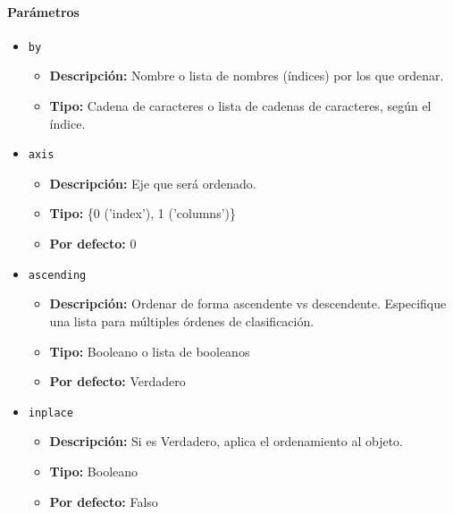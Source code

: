         \paragraph{\textbf{Parámetros}}
        \begin{itemize}
            \item \texttt{by}
                \begin{itemize}
                    \item \textbf{Descripción:} Nombre o lista de nombres (índices) por los que ordenar.
                    \item \textbf{Tipo:} Cadena de caracteres o lista de cadenas de caracteres, según el índice.
                \end{itemize}

            \item \texttt{axis}
                \begin{itemize}
                    \item \textbf{Descripción:} Eje que será ordenado.
                    \item \textbf{Tipo:} \{0 ('index'), 1 ('columns')\}
                    \item \textbf{Por defecto:} 0
                \end{itemize}

            \item \texttt{ascending}
                \begin{itemize}
                    \item \textbf{Descripción:} Ordenar de forma ascendente vs descendente. Especifique una lista para múltiples órdenes de clasificación.
                    \item \textbf{Tipo:} Booleano o lista de booleanos
                    \item \textbf{Por defecto:} Verdadero
                \end{itemize}

            \item \texttt{inplace}
                \begin{itemize}
                    \item \textbf{Descripción:} Si es Verdadero, aplica el ordenamiento al objeto.
                    \item \textbf{Tipo:} Booleano
                    \item \textbf{Por defecto:} Falso
                \end{itemize}


\end{itemize}
